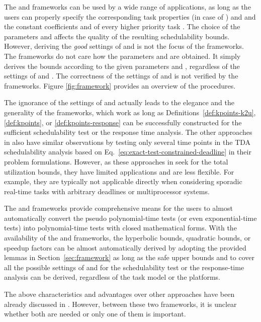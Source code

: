 \documentclass[10pt,conference]{IEEEtran}
\newcommand{\frameworkkq}[1]{}
\newcommand{\frameworkku}[1]{}
\begin{document}
The \frameworkku{} and \frameworkkq{} frameworks can be used by a wide range of applications, as
long as the users can properly specify the corresponding task
properties  (in case of \frameworkkq{}) and  and the constant
coefficients  and  of every higher priority task
. The choice of the parameters  and 
affects the quality of the resulting schedulability bounds.  However,
deriving the \emph{good} settings of  and  is
not the focus of the frameworks. The frameworks do not care how
the parameters  and  are obtained. It simply
derives the bounds according to the given parameters  and
, regardless of the settings of  and . The
correctness of the settings of  and  is not
verified by the frameworks. Figure \ref{fig:framework} provides an overview of the procedures.

The ignorance of the settings of  and  actually
leads to the elegance and the generality of the frameworks, which work
as long as Definitions~\ref{def:kpoints-k2u}, \ref{def:kpoints}, or
\ref{def:kpoints-response} can be successfully constructed for the
sufficient schedulability test or the response time analysis.  The
other approaches in
\cite{journals/tc/LeeSP04,DBLP:dblp_journals/tc/BurchardLOS95,HanTyan-RTSS97}
also have similar observations by testing only several time points in
the TDA schedulability analysis based on
Eq.~\eqref{eq:exact-test-constrained-deadline} in their problem
formulations. However, as these approaches in
\cite{journals/tc/LeeSP04,DBLP:dblp_journals/tc/BurchardLOS95,HanTyan-RTSS97}
seek for the total utilization bounds, they have limited applications
and are less flexible. For example, they are typically not applicable
directly when considering sporadic real-time tasks with arbitrary
deadlines or multiprocessor systems.

The \frameworkku{} and \frameworkkq{} frameworks provide comprehensive means for the users to
almost automatically convert the pseudo polynomial-time tests (or even
exponential-time tests) into polynomial-time tests with closed
mathematical forms.  With the availability of the \frameworkku{} and \frameworkkq{} frameworks,
the hyperbolic bounds, quadratic bounds, or speedup factors can be
almost automatically derived by adopting the provided lemmas in Section~\ref{sec:framework}
as long as the safe upper bounds  and  to cover all the
possible settings of  and  for the schedulability
test or the response-time analysis can be derived, regardless of the
task model or the platforms.

The above characteristics and advantages over other approaches have
been already discussed in
\cite{DBLP:journals/corr/abs-1501.07084,DBLP:conf/rtss/ChenHL15,DBLP:journals/corr/abs-kRTA,DBLP:conf/rtss/ChenHL16}. However,
between these two frameworks, it is unclear
whether both are needed or only one of them is important.
\end{document}
